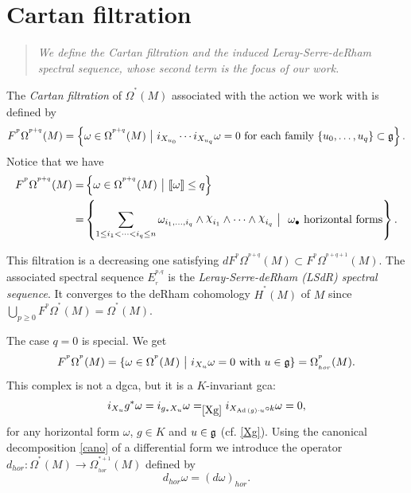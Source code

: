 \documentclass[a4paper,oneside,10pt,reqno]{amsart}
\theoremstyle{definition}
\newcommand\negro{\normalcolor}
\newcommand{\g}{\noindent {\mathfrak{g}}}
\newcommand{\tq}{\ \big| \ }
\newcommand{\Ad}{\mathop{\rm Ad \, } \nolimits}
\newcommand\chii{\raise2pt\hbox{$\chi$}}
\newcommand\Om{\Omega}
\newcommand\om{\omega}
\newcommand{\bi}[2]{{#1}^{^{#2}}}
\newcommand{\hiru}[3]{{#1}^{^{#2}}_{_{#3}}}
\newcommand{\lau}[4]{{#1}^{^{#2}}_{_{#3}}{\left( #4 \right)}}
\newcommand{\coho}[3]{{#1}^{^{#2}}{\left( #3 \right)}}
\begin{document}
\section{Cartan filtration}

\begin{quote}
\emph{
We define the Cartan filtration and the induced Leray-Serre-deRham  spectral sequence, whose second term is the focus of our work.
}
\end{quote}


The \emph{Cartan filtration} of $\lau{\Om}{*}{}{M}$ associated with the  action we work with is defined by
$$
\bi{F}{p}\lau{\Om}{p+q}{}{M}  = \left\{ \om \in \lau{\Om}{p+q}{}{M} \tq
i_{X_{u_0}} \cdots i_{X_{u_q}}\om= 0
\hbox{ for each family } \{ u_0, \ldots,u_q\}  \subset \g\right\} .
$$
Notice that we have
\begin{align*}
 \bi{F}{p}\lau{\Om}{p+q}{}{M}  = &\left\{ \om \in \lau{\Om}{p+q}{}{M} \tq \llbracket \omega\rrbracket  \leq q \right\} \\ =& \left\{ \sum_{1\leq i_1 < \cdots < i_q\leq n } \om_{i_1, \ldots,i_q}  \wedge \chii_{i_1} \wedge \cdots \wedge \chii_{i_q} \tq  \hbox{  $\om_\bullet$  horizontal forms}\right\}.
\end{align*}

This filtration is a decreasing one satisfying $d\bi{F}{p}\lau{\Om}{p+q}{}{M} \subset \bi{F}{p}\lau{\Om}{p+q+1}{}{M}$. The associated spectral sequence 
$\hiru E {p,q} r $
is the \emph{Leray-Serre-deRham (LSdR) spectral sequence}. It converges to the deRham cohomology $\coho H*M$ of $M$ since $\bigcup_{p\geq 0} \bi{F}{p}\lau{\Om}{*}{}{M} =\coho \Om *M$.


The case $q=0$ is special. We get
$$
\bi{F}{p}\lau{\Om}{p}{}{M} = \{ \om \in \lau{\Om}{p}{}{M} \tq
i_{X_u} \om= 0 \hbox{ with }
u\in \g
\}
= \lau\Om p {hor}  M.
$$
  This complex is not a dgca, but it is a $K$-invariant gca:
\begin{equation}\label{hor}
i_{X_u} g^*\omega = i_{g_*X_u} \omega =_{\eqref{Xg}}  i_{X_{\Ad(g) \cdot u}\circ k}\omega =0,
\end{equation}
for any horizontal form $\omega$, $g\in K$ and $u\in \g$   (cf. \eqref{Xg}).\negro 
Using the canonical decomposition \eqref{cano} of a differential form we introduce the operator  $d_{hor} \colon \coho \Omega * M \to \lau \Omega {*+1} {hor} M $ 
defined by
\begin{equation}\label{dhor}
 d_{hor}\om = (d\om)_{hor}.
 \end{equation}
\end{document}

